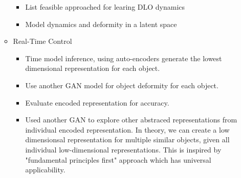 \documentclass[11pt]{article}
\begin{document}
\begin{itemize}
\begin{itemize}
\begin{itemize}
            \item List feasible approached for learing DLO dynamics
            \item Model dynamics and deformity in a latent space
      \end{itemize}
      \item Real-Time Control
      \begin{itemize}
        \item Time model inference, using auto-encoders generate the lowest
        dimensional representation for each object.
        \item Use another GAN model for object deformity for each object.
        \item Evaluate encoded representation for accuracy.
        \item Used another GAN to explore other abstraced representations from
        individual encoded representation. In theory, we can create a low
        dimensionsal representation for multiple similar objects, given all
        individual low-dimensional representations. This is inspired by "fundamental
        principles first" approach which has universal applicability.
      \end{itemize}
  \end{itemize}
\end{itemize}
\end{document}
